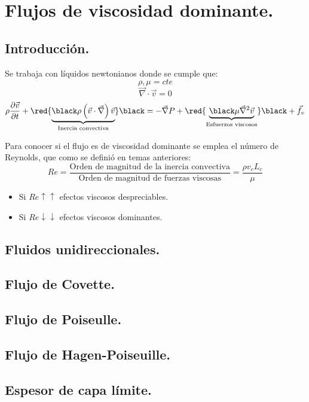 \chapter{Flujos de viscosidad dominante.}
\section{Introducción.}
Se trabaja con líquidos newtonianos donde se cumple que:
\[\rho, \mu =cte\]
\[\vec{\nabla}\cdot\vec{v}=0\]
\[\rho\dfrac{\partial \vec{v}}{\partial t}
+
\red{\underbrace{\black \rho\left(\vec{v}\cdot\vec{\nabla}\right)\vec{v}}_{\text{Inercia convectiva}}} \black
=
-
\vec{\nabla}P
+
\red{\underbrace{\black \mu\vec{\nabla}^2\vec{v} }_{\text{Esfuerzos viscosos}}} \black
+
 \vec{f}_v\]


Para conocer si el flujo es de viscosidad dominante se emplea el número de Reynolds, que como se definió en temas anteriores:
\[Re=\dfrac{\text{Orden de magnitud de la inercia convectiva}}{\text{Orden de magnitud de fuerzas viscosas}}=\dfrac{\rho v_c L_c}{\mu}\]
\begin{itemize}
	\item Si $Re\uparrow\uparrow$ efectos viscosos despreciables.
	\item Si $Re\downarrow\downarrow$ efectos viscosos dominantes.
\end{itemize}

\section{Fluidos unidireccionales.}
\section{Flujo de Covette.}
\section{Flujo de Poiseulle.}
\section{Flujo de Hagen-Poiseuille.}
\section{Espesor de capa límite.}